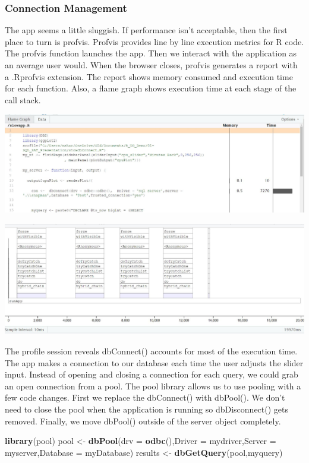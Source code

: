 \documentclass[]{article}
\newenvironment{Shaded}{\begin{snugshade}}{\end{snugshade}}
\newcommand{\DataTypeTok}[1]{\textcolor[rgb]{0.13,0.29,0.53}{#1}}
\newcommand{\KeywordTok}[1]{\textcolor[rgb]{0.13,0.29,0.53}{\textbf{#1}}}
\newcommand{\NormalTok}[1]{#1}
\newcommand{\StringTok}[1]{\textcolor[rgb]{0.31,0.60,0.02}{#1}}
\begin{document}
\hypertarget{connection-management}{%
\subsubsection{Connection Management}\label{connection-management}}

The app seems a little sluggish. If performance isn't acceptable, then
the first place to turn is profvis. Profvis provides line by line
execution metrics for R code. The profvis function launches the app.
Then we interact with the application as an average user would. When the
browser closes, profvis generates a report with a .Rprofvis extension.
The report shows memory consumed and execution time for each function.
Also, a flame graph shows execution time at each stage of the call
stack.

\includegraphics{./Images/ProfvisData.JPG}

\includegraphics{./Images/Flame.JPG}

The profile session reveals dbConnect() accounts for most of the
execution time. The app makes a connection to our database each time the
user adjusts the slider input. Instead of opening and closing a
connection for each query, we could grab an open connection from a pool.
The pool library allows us to use pooling with a few code changes. First
we replace the dbConnect() with dbPool(). We don't need to close the
pool when the application is running so dbDisconnect() gets removed.
Finally, we move dbPool() outside of the server object completely.

\begin{Shaded}
\begin{Highlighting}[]
\KeywordTok{library}\NormalTok{(pool)}
\NormalTok{pool <-}\StringTok{ }\KeywordTok{dbPool}\NormalTok{(}\DataTypeTok{drv =} \KeywordTok{odbc}\NormalTok{(),}\DataTypeTok{Driver =}\NormalTok{ mydriver,}\DataTypeTok{Server =}\NormalTok{ myserver,}\DataTypeTok{Database =}\NormalTok{ myDatabase)}
\NormalTok{  results <-}\StringTok{ }\KeywordTok{dbGetQuery}\NormalTok{(pool,myquery)}
\end{Highlighting}
\end{Shaded}
\end{document}
